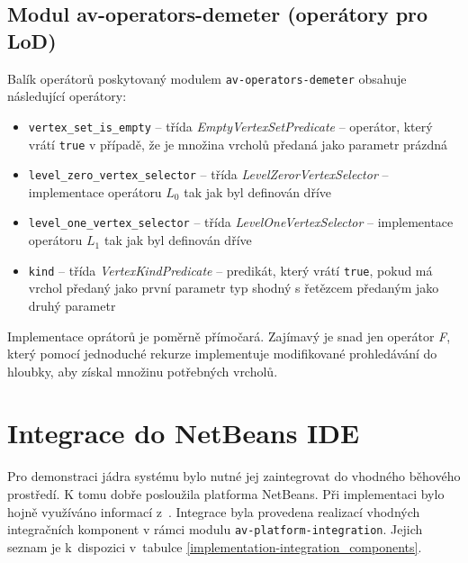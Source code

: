 \subsection{Modul av-operators-demeter (operátory pro LoD)}
Balík operátorů poskytovaný modulem \verb+av-operators-demeter+ obsahuje následující operátory:

\begin{itemize}
\item \verb+vertex_set_is_empty+ -- třída \emph{EmptyVertexSetPredicate} -- operátor, který vrátí \verb+true+ v případě, že je množina vrcholů předaná jako parametr prázdná
\item \verb+level_zero_vertex_selector+ -- třída \emph{LevelZerorVertexSelector} -- implementace operátoru $L_0$ tak jak byl definován dříve
\item \verb+level_one_vertex_selector+ -- třída \emph{LevelOneVertexSelector} -- implementace operátoru $L_1$ tak jak byl definován dříve
\item \verb+kind+ -- třída \emph{VertexKindPredicate} -- predikát, který vrátí \verb+true+, pokud má vrchol předaný jako první parametr typ shodný s řetězcem předaným jako druhý parametr
\end{itemize}

Implementace oprátorů je poměrně přímočará. Zajímavý je snad jen operátor \emph{F}, který pomocí jednoduché rekurze implementuje modifikované prohledávání do hloubky, aby získal množinu potřebných vrcholů.

\section{Integrace do NetBeans IDE}

Pro demonstraci jádra systému bylo nutné jej zaintegrovat do vhodného běhového prostředí. K tomu dobře posloužila platforma NetBeans. Při implementaci bylo hojně využíváno informací z~\cite{netbeans_platform}. Integrace byla provedena realizací vhodných integračních komponent v rámci modulu \verb+av-platform-integration+. Jejich seznam je k~dispozici v~tabulce \ref{implementation-integration_components}.

